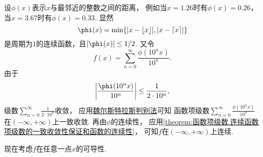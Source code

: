 设\(\phi(x)\)表示\(x\)与最邻近的整数之间的距离，
例如当\(x=1.26\)时有\(\phi(x)=0.26\)，当\(x=3.67\)时有\(\phi(x)=0.33\).
显然\[
	\phi(x) = \min\{\abs{x-\floor{x}},\abs{x-\ceil{x}}\}
\]是周期为\(1\)的连续函数，且\(\abs{\phi(x)}\leq1/2\).
又令\[
	f(x) = \sum_{n=0}^\infty \frac{\phi(10^n x)}{10^n}.
\]
由于\[
	\abs{\frac{\phi(10^n x)}{10^n}} \leq \frac1{2\cdot10^n},
\]
级数\(\sum_{n=0}^\infty \frac1{2\cdot10^n}\)收敛，
应用\hyperref[theorem:无穷级数.魏尔斯特拉斯判别法]{魏尔斯特拉斯判别法}可知
函数项级数\(\sum_{n=0}^\infty \frac{\phi(10^n x)}{10^n}\)
在\((-\infty,+\infty)\)上一致收敛.
再由\(\phi\)的连续性，
应用\cref{theorem:函数项级数.连续函数项级数的一致收敛性保证和函数的连续性}，
可知\(f\)在\((-\infty,+\infty)\)上连续.

现在考虑\(f\)在任意一点\(x\)的可导性.
